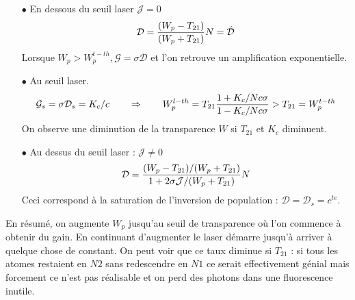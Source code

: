 \begin{itemize}
\item[$\bullet$] En dessous du seuil laser $\mathcal{J}=0$
\begin{equation}
{{\cal D}} = \frac{{({W_p} - {T_{21}})}}{{({W_p} + {T_{21}})}}N = {\hat {\cal D}}
\end{equation}
Lorsque $W_p > W_p^{t-th}, \mathcal{G}=\sigma\mathcal{D}$ et l'on retrouve un amplification 
exponentielle.
\item[$\bullet$] Au seuil laser.
\begin{equation}
{{{\cal G}}_s} = \sigma {{{\cal D}}_s} = {K_c}/c\qquad\Rightarrow\qquad 
W_p^{l - th} = {T_{21}}\frac{{1 + {K_c}/Nc\sigma }}{{1 - {K_c}/Nc\sigma }} > {T_{21}} = W_p^{t - th}
\end{equation}
On observe une diminution de la transparence $W$ si $T_{21}$ et $K_c$ diminuent.
\item[$\bullet$] Au dessus du seuil laser : $\mathcal{J}\neq0$
\begin{equation}
{{\cal D}} = \frac{{({W_p} - {T_{21}})/({W_p} + {T_{21}})}}{{1 + 2\sigma {{\cal J}}/({W_p} + {T_{21}})}}N
\end{equation}
Ceci correspond à la saturation de l'inversion de population : $\mathcal{D}=\mathcal{D}_s=c^{te}$.
\end{itemize}
En résumé, on augmente $W_p$ jusqu'au seuil de transparence où l'on commence à obtenir du gain. En 
continuant d'augmenter le laser démarre jusqu'à arriver à quelque chose de constant. On peut voir 
que ce taux diminue si $T_{21}$ : si tous les atomes restaient en $N2$ sans redescendre en $N1$ ce 
serait effectivement génial mais forcement ce n'est pas réalisable et on perd des photons dans une
fluorescence inutile.



































